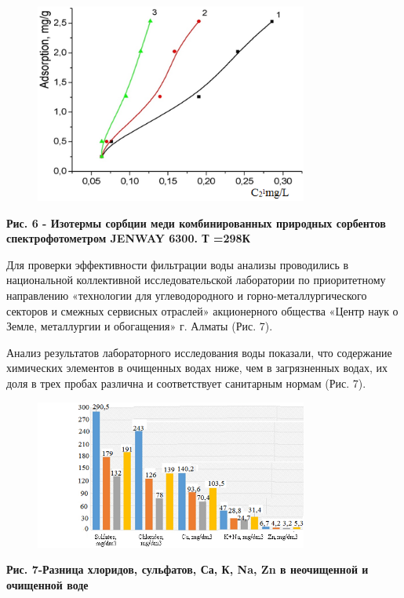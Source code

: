 \begin{figure}[H]
	\centering
	\includegraphics[width=0.8\textwidth]{media/chem/image7}
	\caption*{}
\end{figure}


{\bfseries Рис. 6 - Изотермы сорбции меди комбинированных природных
сорбентов спектрофотометром JENWAY 6300. Т =298К}

Для проверки эффективности фильтрации воды анализы проводились в
национальной коллективной исследовательской лаборатории по приоритетному
направлению «технологии для углеводородного и горно-металлургического
секторов и смежных сервисных отраслей» акционерного общества «Центр наук
о Земле, металлургии и обогащения» г. Алматы (Рис. 7).

Анализ результатов лабораторного исследования воды показали, что
содержание химических элементов в очищенных водах ниже, чем в
загрязненных водах, их доля в трех пробах различна и соответствует
санитарным нормам (Рис. 7).

\begin{figure}[H]
	\centering
	\includegraphics[width=0.8\textwidth]{media/chem/image8}
	\caption*{}
\end{figure}


{\bfseries Рис. 7-Разница хлоридов, сульфатов, Са, К, Na, Zn в неочищенной
и очищенной воде}

